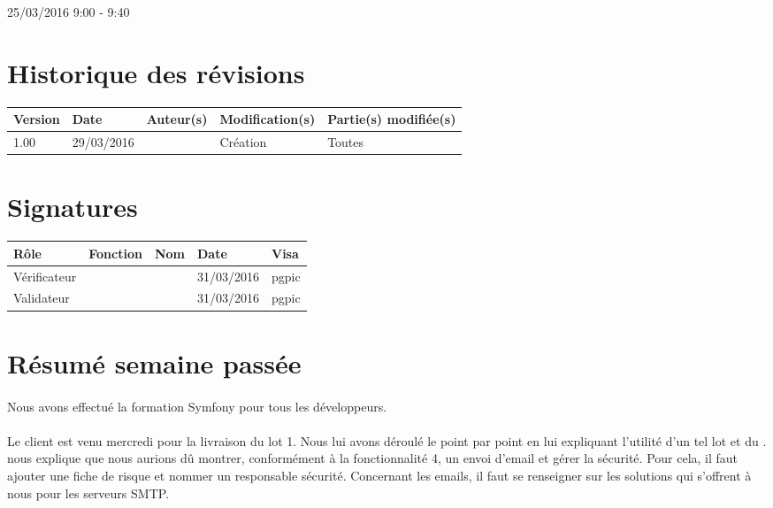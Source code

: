 \documentclass [a4paper] {article}
\begin{document}
25/03/2016			 				%
\hfill   
\hfill 	 9:00 - 9:40 				%


\section*{Historique des révisions}
\begin{center}
			\begin{tabular}{| p{2.5cm} | p{3cm} | p{3cm} | p{3cm} | p{3.5cm} |}
				\hline
				\rowcolor{Gray}
				Version & Date & Auteur(s) & Modification(s) & Partie(s) modifiée(s)		 \\
				\hline
				1.00 & 29/03/2016 & \Pierre & Création & Toutes \\
		\hline		
			\end{tabular}
		\end{center}

\section*{Signatures}

		\begin{center}
			\begin{tabular}{| p{2.5cm} | p{4cm} | p{3cm} | p{3cm} | p{2.5cm} |}
				\hline
				\rowcolor{Gray}
				Rôle & Fonction & Nom & Date & Visa		 \\
				\hline
				Vérificateur & \RQA & \Kafui & 31/03/2016 & pgpic \\[30pt]
				\hline
				Validateur & \CP & \Sergi & 31/03/2016 & pgpic \\[30pt]	
				\hline
			\end{tabular}
		\end{center}


\section{Résumé semaine passée}
\paragraph*{}
Nous avons effectué la formation Symfony pour tous les développeurs.

\paragraph*{}
Le client est venu mercredi pour la livraison du lot 1. Nous lui avons déroulé le \CDR{} point par point en lui expliquant l'utilité d'un tel lot et du \CDRCourt{}. \nomTuteurPedago{} nous explique que nous aurions dû montrer, conformément à la fonctionnalité 4, un envoi d'email et gérer la sécurité. Pour cela, il faut ajouter une fiche de risque et nommer un responsable sécurité. Concernant les emails, il faut se renseigner sur les solutions qui s'offrent à nous pour les serveurs SMTP.
\end{document}
